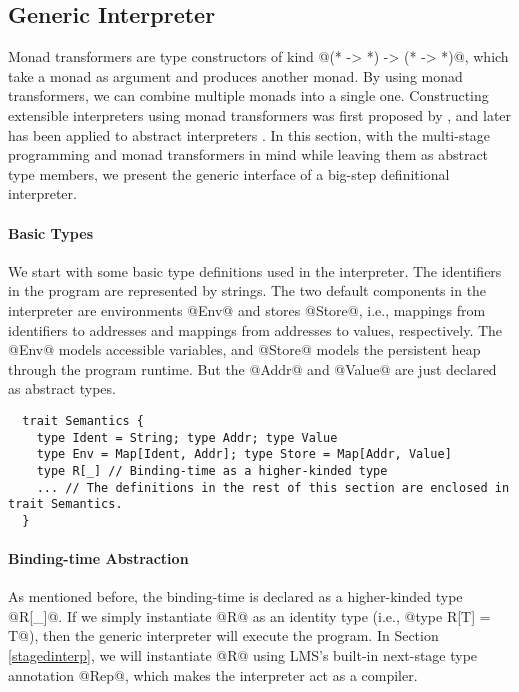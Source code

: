 \subsection{Generic Interpreter} \label{generic_if}

Monad transformers are type constructors of kind @(* -> *) -> (* -> *)@, which
take a monad as argument and produces another monad. By using monad
transformers, we can combine multiple monads into a single one. Constructing
extensible interpreters using monad transformers was first proposed by
\citet{DBLP:conf/popl/LiangHJ95}, and later has been applied to abstract
interpreters \cite{Sergey:2013:MAI:2491956.2491979,
DBLP:journals/pacmpl/DaraisLNH17, Darais:2015:GTM:2814270.2814308}. In this section,
with the multi-stage programming and monad transformers in mind while leaving them
as abstract type members, we present the generic interface of a big-step
definitional interpreter.

\paragraph{Basic Types} We start with some basic type definitions used in the
interpreter. The identifiers in the program are represented by strings. The two
default components in the interpreter are environments @Env@ and stores @Store@,
i.e., mappings from identifiers to addresses and mappings from addresses to
values, respectively. The @Env@ models accessible variables, and @Store@ models
the persistent heap through the program runtime. But the @Addr@ and @Value@ are
just declared as abstract types.

\begin{lstlisting}
  trait Semantics {
    type Ident = String; type Addr; type Value
    type Env = Map[Ident, Addr]; type Store = Map[Addr, Value]
    type R[_] // Binding-time as a higher-kinded type
    ... // The definitions in the rest of this section are enclosed in trait Semantics.
  }
\end{lstlisting}

\paragraph{Binding-time Abstraction} As mentioned before, the binding-time is
declared as a higher-kinded type @R[_]@. If we simply instantiate @R@ as an identity
type (i.e., @type R[T] = T@), then the generic interpreter will execute the program.
In Section \ref{stagedinterp}, we will instantiate @R@ using LMS's built-in
next-stage type annotation @Rep@, which makes the interpreter act as a compiler.

